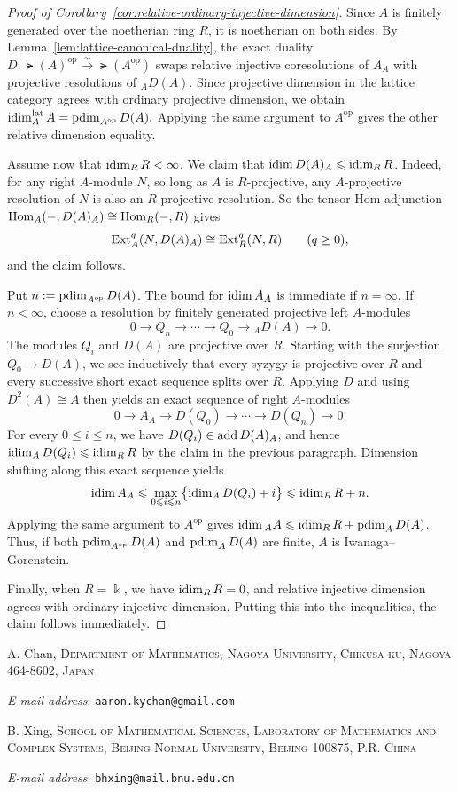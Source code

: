 \documentclass[a4paper,leqno]{amsart}
\makeatletter
\newcommand{\Addresses}{{%
  \bigskip
  \footnotesize

  A. Chan, \textsc{Department of Mathematics, Nagoya University, Chikusa-ku, Nagoya 464-8602, Japan}\par\nopagebreak
  \textit{E-mail address}: \texttt{aaron.kychan@gmail.com}

  \medskip

  B. Xing, \textsc{School of Mathematical Sciences, Laboratory of Mathematics and Complex Systems, Beijing Normal University, Beijing 100875, P.R. China}\par\nopagebreak
  \textit{E-mail address}: \texttt{bhxing@mail.bnu.edu.cn}
}}
\makeatother
\begin{document}
\begin{proof}[Proof of Corollary~\ref{cor:relative-ordinary-injective-dimension}]
Since $A$ is finitely generated over the noetherian ring $R$, it is noetherian on both sides. By Lemma~\ref{lem:lattice-canonical-duality}, the exact duality $D:\lat(A)^{\operatorname{op}}
 \xrightarrow{\sim}\lat(A^{\operatorname{op}})$
swaps relative injective coresolutions of $A_A$ with projective resolutions of ${}_A D(A)$. Since projective dimension in the lattice category agrees with ordinary projective dimension, we obtain $\operatorname{idim}^{\operatorname{lat}}_A A
 =\operatorname{pdim}_{A^{\operatorname{op}}}D(A).$
Applying the same argument to $A^{\operatorname{op}}$ gives the other relative dimension equality.

Assume now that $\operatorname{idim}_R R<\infty$. 
We claim that $\operatorname{idim} D(A)_A\leqslant\operatorname{idim}_R R$.  Indeed, for any right $A$-module $N$, so long as $A$ is $R$-projective, any $A$-projective resolution of $N$ is also an $R$-projective resolution.  So the tensor-Hom adjunction $\operatorname{Hom}_A(-,D(A)_A)\cong\operatorname{Hom}_R(-,R)$ gives
\[
 \operatorname{Ext}_A^q(N,D(A)_A)
 \cong \operatorname{Ext}_R^q(N,R)
 \qquad(q\geq0),
\]
and the claim follows.

Put $n:=\operatorname{pdim}_{A^{\operatorname{op}}}D(A)$. The bound for $\operatorname{idim} A_A$ is immediate if $n=\infty$. If $n<\infty$, choose a resolution by finitely generated projective left $A$-modules
\[
 0\longrightarrow Q_n\longrightarrow\cdots
 \longrightarrow Q_0\longrightarrow {}_A D(A)
 \longrightarrow0.
\]
The modules $Q_i$ and $D(A)$ are projective over $R$. Starting with the surjection $Q_0\to D(A)$, we see inductively that every syzygy is projective over $R$ and every successive short exact sequence splits over $R$. Applying $D$ and using $D^2(A)\cong A$ then yields an exact sequence of right $A$-modules
\[
 0\longrightarrow A_A\longrightarrow D(Q_0)
 \longrightarrow\cdots\longrightarrow D(Q_n)
 \longrightarrow0.
\]
For every $0\leq i\leq n$, we have $D(Q_i)\in\operatorname{add} D(A)_A$, and hence $\operatorname{idim}_A D(Q_i)\leqslant\operatorname{idim}_R R$ by the claim in the previous paragraph. Dimension shifting along this exact sequence yields
\[
 \operatorname{idim} A_A
 \leqslant
 \max_{0\leqslant i\leqslant n}
 \bigl\{\operatorname{idim}_A D(Q_i)+i\bigr\}
 \leqslant \operatorname{idim}_R R+n.
\]
Applying the same argument to $A^{\operatorname{op}}$ gives
$\operatorname{idim} {}_A A\leqslant\operatorname{idim}_R R+\operatorname{pdim}_A D(A)$.  Thus, if both $\operatorname{pdim}_{A^{\operatorname{op}}}D(A)$ and $\operatorname{pdim}_{A}D(A)$ are finite, $A$ is Iwanaga--Gorenstein.

Finally, when $R=\Bbbk$, we have $\operatorname{idim}_R R=0$, and relative injective dimension agrees with ordinary injective dimension.  Putting this into the inequalities, the claim follows immediately.
\end{proof}



\Addresses
\end{document}
